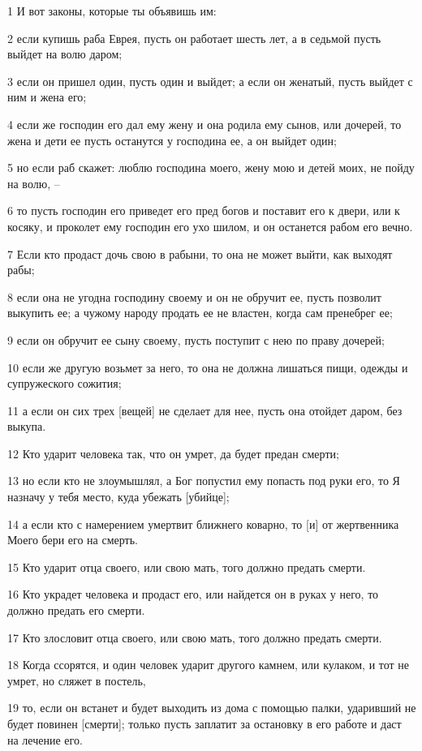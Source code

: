 \par 1 И вот законы, которые ты объявишь им:
\par 2 если купишь раба Еврея, пусть он работает шесть лет, а в седьмой пусть выйдет на волю даром;
\par 3 если он пришел один, пусть один и выйдет; а если он женатый, пусть выйдет с ним и жена его;
\par 4 если же господин его дал ему жену и она родила ему сынов, или дочерей, то жена и дети ее пусть останутся у господина ее, а он выйдет один;
\par 5 но если раб скажет: люблю господина моего, жену мою и детей моих, не пойду на волю, --
\par 6 то пусть господин его приведет его пред богов и поставит его к двери, или к косяку, и проколет ему господин его ухо шилом, и он останется рабом его вечно.
\par 7 Если кто продаст дочь свою в рабыни, то она не может выйти, как выходят рабы;
\par 8 если она не угодна господину своему и он не обручит ее, пусть позволит выкупить ее; а чужому народу продать ее не властен, когда сам пренебрег ее;
\par 9 если он обручит ее сыну своему, пусть поступит с нею по праву дочерей;
\par 10 если же другую возьмет за него, то она не должна лишаться пищи, одежды и супружеского сожития;
\par 11 а если он сих трех [вещей] не сделает для нее, пусть она отойдет даром, без выкупа.
\par 12 Кто ударит человека так, что он умрет, да будет предан смерти;
\par 13 но если кто не злоумышлял, а Бог попустил ему попасть под руки его, то Я назначу у тебя место, куда убежать [убийце];
\par 14 а если кто с намерением умертвит ближнего коварно, то [и] от жертвенника Моего бери его на смерть.
\par 15 Кто ударит отца своего, или свою мать, того должно предать смерти.
\par 16 Кто украдет человека и продаст его, или найдется он в руках у него, то должно предать его смерти.
\par 17 Кто злословит отца своего, или свою мать, того должно предать смерти.
\par 18 Когда ссорятся, и один человек ударит другого камнем, или кулаком, и тот не умрет, но сляжет в постель,
\par 19 то, если он встанет и будет выходить из дома с помощью палки, ударивший не будет повинен [смерти]; только пусть заплатит за остановку в его работе и даст на лечение его.
